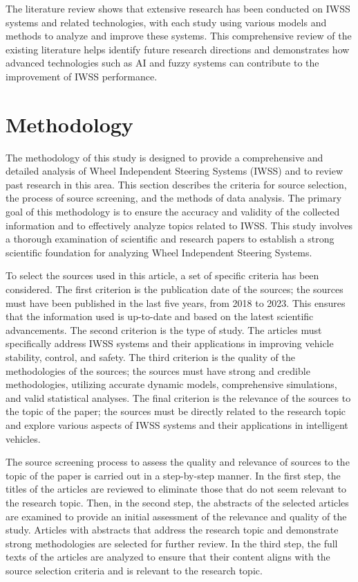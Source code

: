 \documentclass[a4paper,10pt]{article}
\begin{document}
        The literature review shows that extensive research has been conducted on IWSS systems and related technologies, with each study using various models and methods to analyze and improve these systems. This comprehensive review of the existing literature helps identify future research directions and demonstrates how advanced technologies such as AI and fuzzy systems can contribute to the improvement of IWSS performance.

    \section{Methodology}

        The methodology of this study is designed to provide a comprehensive and detailed analysis of Wheel Independent Steering Systems (IWSS) and to review past research in this area. This section describes the criteria for source selection, the process of source screening, and the methods of data analysis. The primary goal of this methodology is to ensure the accuracy and validity of the collected information and to effectively analyze topics related to IWSS. This study involves a thorough examination of scientific and research papers to establish a strong scientific foundation for analyzing Wheel Independent Steering Systems.

        To select the sources used in this article, a set of specific criteria has been considered. The first criterion is the publication date of the sources; the sources must have been published in the last five years, from 2018 to 2023. This ensures that the information used is up-to-date and based on the latest scientific advancements. The second criterion is the type of study. The articles must specifically address IWSS systems and their applications in improving vehicle stability, control, and safety. The third criterion is the quality of the methodologies of the sources; the sources must have strong and credible methodologies, utilizing accurate dynamic models, comprehensive simulations, and valid statistical analyses. The final criterion is the relevance of the sources to the topic of the paper; the sources must be directly related to the research topic and explore various aspects of IWSS systems and their applications in intelligent vehicles.

        The source screening process to assess the quality and relevance of sources to the topic of the paper is carried out in a step-by-step manner. In the first step, the titles of the articles are reviewed to eliminate those that do not seem relevant to the research topic. Then, in the second step, the abstracts of the selected articles are examined to provide an initial assessment of the relevance and quality of the study. Articles with abstracts that address the research topic and demonstrate strong methodologies are selected for further review. In the third step, the full texts of the articles are analyzed to ensure that their content aligns with the source selection criteria and is relevant to the research topic.
\end{document}
